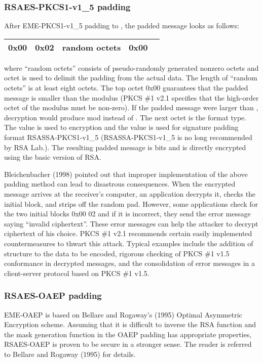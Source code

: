 \documentclass{article}
\begin{document}
\subsubsection{RSAES-PKCS1-v1\_5 padding}
After EME-PKCS1-v1\_5 padding to , the padded message  looks 
as follows:
\begin{center}
\begin{tabular}{|c|c|c|c|c|}\hline
0x00 & 0x02 & random octets & 0x00 & \\ \hline
\end{tabular}
\end{center}
where ``random octets'' consists of pseudo-randomly generated 
nonzero octets and  octet is used to delimit 
the padding from the actual data.
The length of ``random octets'' is at least eight octets.
The top octet 0x00 guarantees that the padded message 
is smaller than the modulus  (PKCS \#1 v2.1 specifies that 
the high-order octet of the modulus must be non-zero). 
If the padded message  were 
larger than ,  decryption would produce  mod  instead of . 
The next octet  is the format type.
The value   is used to encryption and the value
 is used for signature padding format  RSASSA-PKCS1-v1\_5 
(RSASSA-PKCS1-v1\_5 is no long recommended by RSA Lab.).
The resulting padded message  is
 bits and is directly encrypted using the basic version of
RSA.

Bleichenbacher (1998) pointed out that improper implementation
of the above padding method can lead to disastrous consequences.
When the encrypted message arrives at the receiver's computer,
an application decrypts it, checks the initial block, and strips off the 
random pad. However, some applications check for the two initial
blocks 0x00 02 and if it is incorrect, they send the error
message saying ``invalid ciphertext''. These error messages can help
the attacker to decrypt ciphertext of his choice.
PKCS \#1 v2.1 recommends certain easily implemented countermeasures 
to thwart this attack. Typical examples include the addition
of structure to the data to be encoded, rigorous checking of 
PKCS \#1 v1.5 conformance in decrypted messages, and the consolidation of 
error messages in a client-server protocol based on PKCS \#1 v1.5.

\subsubsection{RSAES-OAEP padding}
EME-OAEP is based on Bellare and Rogaway's (1995) Optimal Asymmetric 
Encryption scheme.
Assuming that it is difficult to inverse the RSA function and the 
mask generation function in the OAEP padding has appropriate 
properties, RSAES-OAEP is proven to be secure in a stronger sense.
The reader is referred to Bellare and Rogaway (1995) for 
details.
\end{document}

